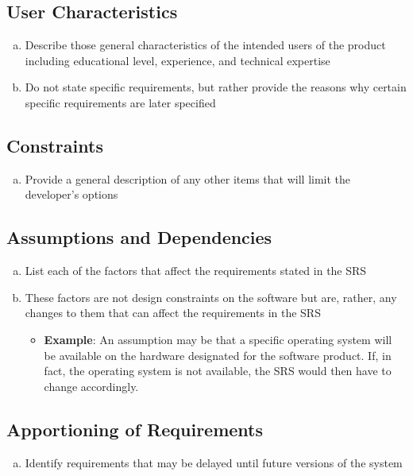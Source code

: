 \documentclass[english]{article}
\begin{document}
\subsection{User Characteristics}
\label{sub:user_characteristics}
\begin{enumerate}[a)]
	\item Describe those general characteristics of the intended users of the product including educational level, experience, and technical expertise
	\item Do not state specific requirements, but rather provide the reasons why certain specific requirements are later specified
\end{enumerate}

\subsection{Constraints}
\label{sub:constraints}
\begin{enumerate}[a)]
	\item Provide a general description of any other items that will limit the developer's options
\end{enumerate}

\subsection{Assumptions and Dependencies}
\label{sub:assumptions_and_dependencies}
\begin{enumerate}[a)]
	\item List each of the factors that affect the requirements stated in the SRS
	\item These factors are not design constraints on the software but are, rather, any changes to them that can affect the requirements in the SRS
	\begin{itemize}
		\item \textbf{Example}: An assumption may be that a specific operating system will be available on the hardware designated for the software product. If, in fact, the operating system is not available, the SRS would then have to change accordingly.
	\end{itemize}
\end{enumerate}

\subsection{Apportioning of Requirements}
\label{sub:apportioning_of_requirements}
\begin{enumerate}[a)]
	\item Identify requirements that may be delayed until future versions of the system
\end{enumerate}
\end{document}
